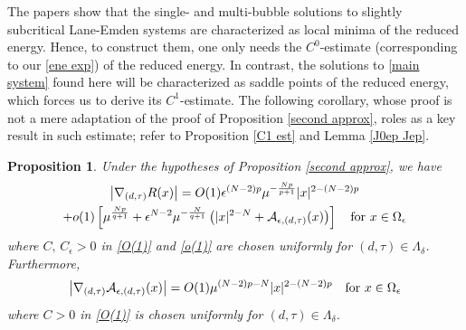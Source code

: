 \documentclass[reqno]{amsart}
\newtheorem{proposition}[theorem]{Proposition}
\theoremstyle{remark}
\newcommand{\ep}{\epsilon}
\newcommand{\mca}{\mathcal{A}}
\renewcommand{\(}{\left(}
\renewcommand{\)}{\right)}
\numberwithin{equation}{section}
\begin{document}
The papers \cite{KP, KM} show that the single- and multi-bubble solutions to slightly subcritical Lane-Emden systems are characterized as local minima of the reduced energy.
Hence, to construct them, one only needs the $C^0$-estimate (corresponding to our \eqref{ene exp}) of the reduced energy.
In contrast, the solutions to \eqref{main system} found here will be characterized as saddle points of the reduced energy, which forces us to derive its $C^1$-estimate.
The following corollary, whose proof is not a mere adaptation of the proof of Proposition \ref{second approx}, roles as a key result in such estimate; refer to Proposition \ref{C1 est} and Lemma \ref{J0ep Jep}.
\begin{proposition}\label{second approx2}
Under the hypotheses of Proposition \ref{second approx}, we have
\begin{multline}\label{R C1}
\left|\nabla_{(d,\tau)} R(x)\right| = O(1) \ep^{(N-2)p}\mu^{-\frac{Np}{p+1}}|x|^{2-(N-2)p} \\
+ o(1)\left[\mu^{\frac{N p}{q+1}} + \ep^{N-2}\mu^{-\frac{N}{q+1}} \({|x|^{2-N}}+\mca_{\ep,(d,\tau)}(x)\)\right] \quad \textup{for } x \in \Omega_\ep
\end{multline}
where $C,\, C_\ep > 0$ in \eqref{O(1)} and \eqref{o(1)} are chosen uniformly for $(d,\tau) \in \Lambda_\delta$. Furthermore,
\begin{equation}\label{mca est C1}
\left|\nabla_{(d,\tau)} \mca_{\ep,(d,\tau)}(x)\right| = O(1)\mu^{(N-2)p-N}|x|^{2-(N-2)p} \quad \textup{for } x \in \Omega_\ep
\end{equation}
where $C > 0$ in \eqref{O(1)} is chosen uniformly for $(d,\tau)\in \Lambda_\delta$.
\end{proposition}
\end{document}
